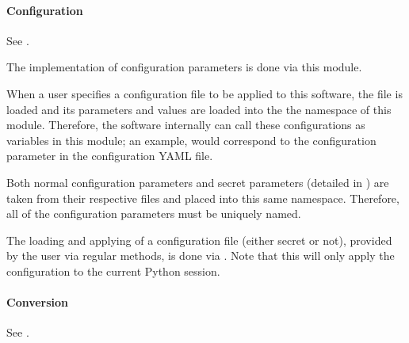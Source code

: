 \documentclass[letterpaper,11pt,english]{sphinxmanual}
\begin{document}
\paragraph{Configuration}
\label{\detokenize{technical/architecture/library:configuration}}
\sphinxAtStartPar
See {\hyperref[\detokenize{code/opihiexarata.library.config:module-opihiexarata.library.config}]{}}.

\sphinxAtStartPar
The implementation of configuration parameters is done via this module.

\sphinxAtStartPar
When a user specifies a configuration file to be applied to this software, the
file is loaded and its parameters and values are loaded into the the
namespace of this module. Therefore, the software internally can call these
configurations as variables in this module; an example,
 would correspond to the
 configuration parameter in the configuration YAML file.

\sphinxAtStartPar
Both normal configuration parameters and secret parameters (detailed in
{\hyperref[\detokenize{user/configuration:user-configuration}]{}}) are taken from their respective files and placed
into this same namespace. Therefore, all of the configuration parameters must
be uniquely named.

\sphinxAtStartPar
The loading and applying of a configuration file (either secret or not),
provided by the user via regular methods, is done via
{\hyperref[\detokenize{code/opihiexarata.library.config:opihiexarata.library.config.load_then_apply_configuration}]{}}. Note that
this will only apply the configuration to the current Python session.


\paragraph{Conversion}
\label{\detokenize{technical/architecture/library:conversion}}\label{\detokenize{technical/architecture/library:technical-architecture-library-conversion}}
\sphinxAtStartPar
See {\hyperref[\detokenize{code/opihiexarata.library.conversion:module-opihiexarata.library.conversion}]{}}.
\end{document}

